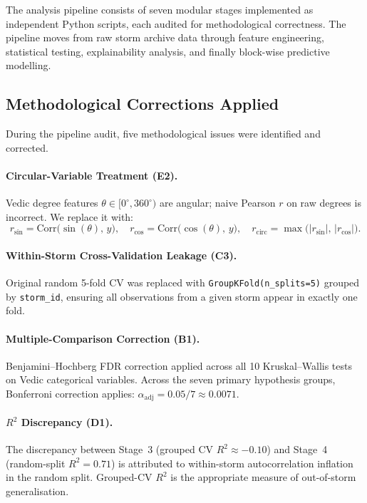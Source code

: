 \documentclass[12pt,a4paper]{article}
\begin{document}
The analysis pipeline consists of seven modular stages implemented as
independent Python scripts, each audited for methodological correctness.
The pipeline moves from raw storm archive data through feature engineering,
statistical testing, explainability analysis, and finally block-wise predictive
modelling.

\subsection{Methodological Corrections Applied}

During the pipeline audit, five methodological issues were identified and
corrected.

\paragraph{Circular-Variable Treatment (E2).} Vedic degree features
$\theta \in [0^\circ, 360^\circ)$ are angular; naive Pearson $r$ on raw
degrees is incorrect. We replace it with:
\begin{equation}
  r_{\sin} = \mathrm{Corr}\bigl(\sin(\theta),\, y\bigr), \quad
  r_{\cos} = \mathrm{Corr}\bigl(\cos(\theta),\, y\bigr), \quad
  r_{\text{circ}} = \max\!\bigl(|r_{\sin}|,\, |r_{\cos}|\bigr).
\end{equation}

\paragraph{Within-Storm Cross-Validation Leakage (C3).} Original random
5-fold CV was replaced with \texttt{GroupKFold(n\_splits=5)} grouped by
\texttt{storm\_id}, ensuring all observations from a given storm appear in
exactly one fold.

\paragraph{Multiple-Comparison Correction (B1).} Benjamini--Hochberg FDR
correction applied across all 10 Kruskal--Wallis tests on Vedic categorical
variables. Across the seven primary hypothesis groups, Bonferroni correction
applies: $\alpha_{\text{adj}} = 0.05/7 \approx 0.0071$.

\paragraph{$R^2$ Discrepancy (D1).} The discrepancy between Stage~3 (grouped
CV $R^2 \approx -0.10$) and Stage~4 (random-split $R^2 = 0.71$) is attributed
to within-storm autocorrelation inflation in the random split. Grouped-CV
$R^2$ is the appropriate measure of out-of-storm generalisation.
\end{document}
